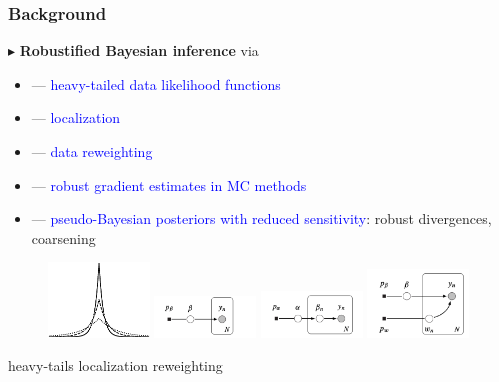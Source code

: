 \documentclass[hyperref={colorlinks = true},unknownkeysallowed]{beamer}
\let\oldcitep=\citep
\renewcommand\citep[1]{\hypersetup{linkcolor=darkred}\hyperlink{#1}{\oldcitep{#1}}}
\begin{document}
\begin{frame}
	\frametitle{Background}
	$\blacktriangleright$ \textbf{Robustified Bayesian inference} via 
	\begin{itemize}
		\item --- \textcolor{blue}{heavy-tailed data likelihood functions}~\citep{huber09, insua12}
		\item --- \textcolor{blue}{localization}~\citep{definetti61, wang18}
		\item --- \textcolor{blue}{data reweighting}~\citep{wang17} 
		\item --- \textcolor{blue}{robust gradient estimates in MC methods}~\citep{bhatia19}
		\item --- \textcolor{blue}{pseudo-Bayesian posteriors with reduced sensitivity}: robust divergences, coarsening~\citep{futami18, knoblauch18, miller19}
	\end{itemize}
	\begin{figure}
		\begin{center}
			\includegraphics[width=0.24\textwidth,valign=c]{figs/heavy_tails.eps}
			\includegraphics[width=0.24\textwidth,valign=c]{figs/original.png}
			\includegraphics[width=0.24\textwidth,valign=c]{figs/localized.png}
			\includegraphics[width=0.24\textwidth,valign=c]{figs/reweighted.png}
		\end{center}
	\end{figure}
	\qquad heavy-tails \qquad\qquad \qquad\qquad\quad localization \qquad reweighting
	
\end{frame}
\end{document}
